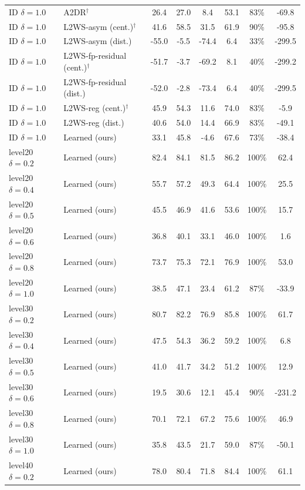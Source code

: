 \begin{tabular}{llcccccc}
ID $\delta=1.0$ & A2DR$^\dagger$ & 26.4 & 27.0 & 8.4 & 53.1 & 83\% & -69.8 \\
ID $\delta=1.0$ & L2WS-asym (cent.)$^\dagger$ & 41.6 & 58.5 & 31.5 & 61.9 & 90\% & -95.8 \\
ID $\delta=1.0$ & L2WS-asym (dist.) & -55.0 & -5.5 & -74.4 & 6.4 & 33\% & -299.5 \\
ID $\delta=1.0$ & L2WS-fp-residual (cent.)$^\dagger$ & -51.7 & -3.7 & -69.2 & 8.1 & 40\% & -299.2 \\
ID $\delta=1.0$ & L2WS-fp-residual (dist.) & -52.0 & -2.8 & -73.4 & 6.4 & 40\% & -299.5 \\
ID $\delta=1.0$ & L2WS-reg (cent.)$^\dagger$ & 45.9 & 54.3 & 11.6 & 74.0 & 83\% & -5.9 \\
ID $\delta=1.0$ & L2WS-reg (dist.) & 40.6 & 54.0 & 14.4 & 66.9 & 83\% & -49.1 \\
ID $\delta=1.0$ & Learned (ours) & 33.1 & 45.8 & -4.6 & 67.6 & 73\% & -38.4 \\
level20 $\delta=0.2$ & Learned (ours) & 82.4 & 84.1 & 81.5 & 86.2 & 100\% & 62.4 \\
level20 $\delta=0.4$ & Learned (ours) & 55.7 & 57.2 & 49.3 & 64.4 & 100\% & 25.5 \\
level20 $\delta=0.5$ & Learned (ours) & 45.5 & 46.9 & 41.6 & 53.6 & 100\% & 15.7 \\
level20 $\delta=0.6$ & Learned (ours) & 36.8 & 40.1 & 33.1 & 46.0 & 100\% & 1.6 \\
level20 $\delta=0.8$ & Learned (ours) & 73.7 & 75.3 & 72.1 & 76.9 & 100\% & 53.0 \\
level20 $\delta=1.0$ & Learned (ours) & 38.5 & 47.1 & 23.4 & 61.2 & 87\% & -33.9 \\
level30 $\delta=0.2$ & Learned (ours) & 80.7 & 82.2 & 76.9 & 85.8 & 100\% & 61.7 \\
level30 $\delta=0.4$ & Learned (ours) & 47.5 & 54.3 & 36.2 & 59.2 & 100\% & 6.8 \\
level30 $\delta=0.5$ & Learned (ours) & 41.0 & 41.7 & 34.2 & 51.2 & 100\% & 12.9 \\
level30 $\delta=0.6$ & Learned (ours) & 19.5 & 30.6 & 12.1 & 45.4 & 90\% & -231.2 \\
level30 $\delta=0.8$ & Learned (ours) & 70.1 & 72.1 & 67.2 & 75.6 & 100\% & 46.9 \\
level30 $\delta=1.0$ & Learned (ours) & 35.8 & 43.5 & 21.7 & 59.0 & 87\% & -50.1 \\
level40 $\delta=0.2$ & Learned (ours) & 78.0 & 80.4 & 71.8 & 84.4 & 100\% & 61.1 \\

\end{tabular}
